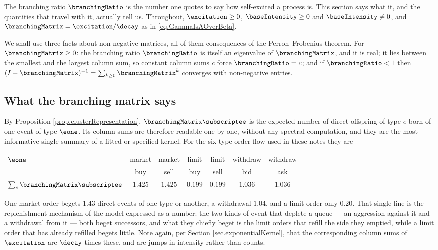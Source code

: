 The branching ratio $\branchingRatio$ is the number one quotes to say how self-excited a
process is.
This section says what it, and the quantities that travel with it, actually tell us.
Throughout, $\excitation \geq 0$, $\baseIntensity \geq 0$ and $\baseIntensity \neq 0$,
and $\branchingMatrix = \excitation/\decay$ as in \eqref{eq.GammaIsAOverBeta}.

We shall use three facts about non-negative matrices,
all of them consequences of the Perron--Frobenius theorem.
For $\branchingMatrix \geq 0$:
the branching ratio $\branchingRatio$ is itself an eigenvalue of $\branchingMatrix$, and it is real;
it lies between the smallest and the largest column sum,
so constant column sums $c$ force $\branchingRatio = c$;
and if $\branchingRatio < 1$ then
$(I-\branchingMatrix)^{-1} = \sum_{k\geq 0} \branchingMatrix^{k}$
converges with non-negative entries.

\subsection{What the branching matrix says}

By Proposition \ref{prop.clusterRepresentation},
$\branchingMatrix\subscriptee$ is the expected number of direct offspring of type $e$
born of one event of type $\eone$.
Its column sums are therefore readable one by one,
without any spectral computation,
and they are the most informative single summary of a fitted or specified kernel.
For the six-type order flow used in these notes they are
\begin{center}
 \begin{tabular}{lcccccc}
  \toprule
  $\eone$ & market & market & limit & limit & withdraw & withdraw \\
  & buy & sell & buy & sell & bid & ask \\
  \midrule
  $\sum_e \branchingMatrix\subscriptee$ & $1.425$ & $1.425$ & $0.199$ & $0.199$ & $1.036$ & $1.036$ \\
  \bottomrule
 \end{tabular}
\end{center}
One market order begets $1.43$ direct events of one type or another,
a withdrawal $1.04$, and a limit order only $0.20$.
That single line is the replenishment mechanism of the model expressed as a number:
the two kinds of event that deplete a queue --- an aggression against it and a withdrawal
from it --- both beget successors, and what they chiefly beget is the limit orders that
refill the side they emptied, while a limit order that has already refilled begets little.
Note again, per Section \ref{sec.exponentialKernel},
that the corresponding column sums of $\excitation$ are $\decay$ times these,
and are jumps in intensity rather than counts.

